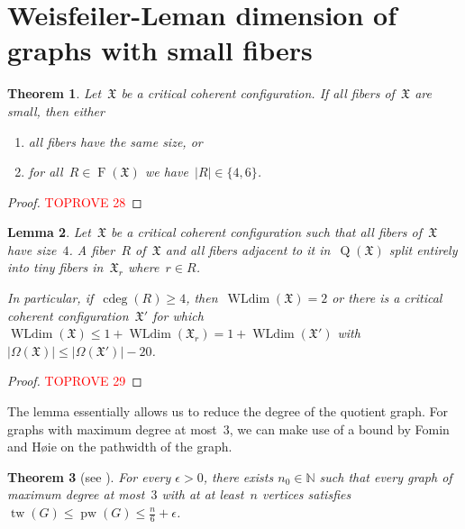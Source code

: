 \documentclass[english,a4paper]{article}
\theoremstyle{plain}
\newtheorem{theorem}             {Theorem}[section]
\newtheorem{lemma}      [theorem]{Lemma}
\theoremstyle{definition}
\newcommand{\Nat}{\ensuremath{\mathbb{N}}}
\newcommand{\abs}[1]{| #1 |}
\DeclareMathOperator{\Fibers}{F}
\newcommand{\coherentConfig}{\ensuremath{\mathfrak{X}}}
\newcommand{\fibers}[1]{\ensuremath{\Fibers \left( #1 \right)}}
\newcommand{\vertices}{\ensuremath{\Omega}}
\DeclareMathOperator*{\WLdim}{WLdim}
\newcommand{\wldim}[1]{\ensuremath{\WLdim\left(#1\right)}}
\DeclareMathOperator*{\Quotient}{Q}
\newcommand{\quotientGraph}[1]{\ensuremath{\Quotient(#1)}}
\DeclareMathOperator{\ColorDeg}{cdeg}
\newcommand{\colorDeg}[1]{\ensuremath{\ColorDeg\left(#1\right)}}
\DeclareMathOperator{\treewidth}{tw}
\DeclareMathOperator{\pathwidth}{pw}
\begin{document}
 


\section{Weisfeiler-Leman dimension of graphs with small fibers}
\label{wldim-small/sec}


\begin{theorem}
    \label{critical:small-cc/thm}
    Let~$\coherentConfig$ be a critical coherent configuration.
    If all fibers of~$\coherentConfig$ are small, then either
    \begin{enumerate}
        \item all fibers have the same size, or
        \item for all~$R \in \fibers{\coherentConfig}$ we have~$\abs{R} \in \{4,6\}$.
    \end{enumerate}
\end{theorem}
\begin{proof}\textcolor{red}{TOPROVE 28}\end{proof}


\begin{lemma}
\label{4-cc:cdeg-decrease/lem}
    Let~$\coherentConfig$ be a critical coherent configuration such that all fibers of~$\coherentConfig$ have size~$4$.
    A fiber~$R$ of~$\coherentConfig$ and all fibers adjacent to it in~$\quotientGraph{\coherentConfig}$ split entirely into tiny fibers in~$\coherentConfig_r$ where~$r \in R$.

    In particular, if~$\colorDeg{R} \geq 4$, then~$\wldim{\coherentConfig}=2$ or  there is a critical coherent configuration~$\coherentConfig'$ for which $\wldim{\coherentConfig} \leq  1 + \wldim{\coherentConfig_r} = 1 + \wldim{\coherentConfig'}$ with~$\abs{\vertices(\coherentConfig)} \leq \abs{\vertices(\coherentConfig')} - 20$.
\end{lemma}
\begin{proof}\textcolor{red}{TOPROVE 29}\end{proof}


The lemma essentially allows us to reduce the degree of the quotient graph. For graphs with maximum degree at most~$3$, we can make use of a bound by Fomin and H{\o}ie on the pathwidth of the graph.


\begin{theorem}[see \cite{pathwidthCubicGraphs}]
\label{tw-cubic-graph/lem}
    For every $\epsilon > 0$, there exists $n_0 \in \Nat$ such that every graph of maximum degree at most~$3$ with at at least~$n$ vertices satisfies $\treewidth(G)\leq \pathwidth(G) \leq \frac{n}{6} + \epsilon$.
\end{theorem}
\end{document}

